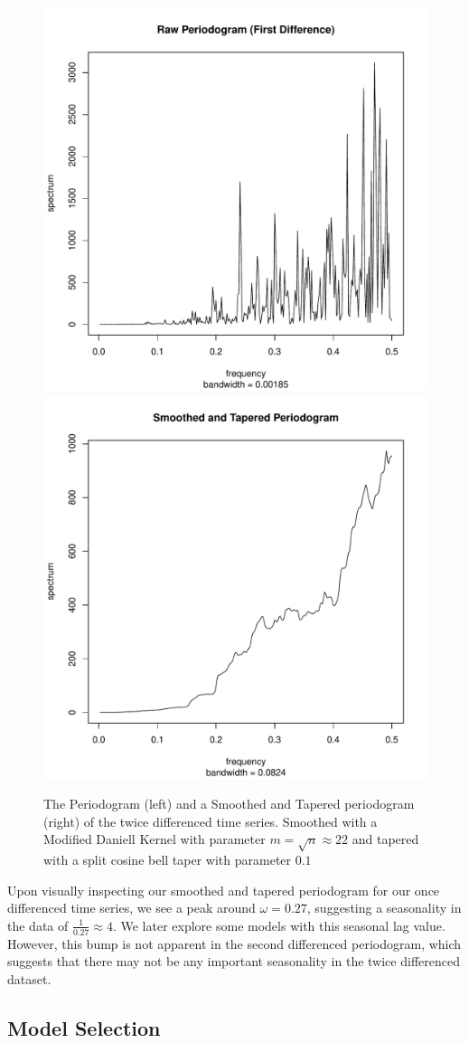 \documentclass[11pt]{paper}
\begin{document}
\begin{figure}
\centering
\includegraphics[width=0.45\linewidth]{../image/raw_periodogram_2.pdf}
\includegraphics[width=0.45\linewidth]{../image/smooth_tapered_periodogram_2.pdf}
\caption{The Periodogram (left) and a Smoothed and Tapered periodogram (right) of the twice differenced time series. Smoothed with a Modified Daniell Kernel with parameter $m = \sqrt{n} \approx 22$ and tapered with a split cosine bell taper with parameter $0.1$}
\label{periodogram2}
\end{figure}

Upon visually inspecting our smoothed and tapered periodogram for our once differenced time series, we see a peak around $\omega = 0.27$, suggesting a seasonality in the data of $\frac{1}{0.27} \approx 4$. We later explore some models with this seasonal lag value. However, this bump is not apparent in the second differenced periodogram, which suggests that there may not be any important seasonality in the twice differenced dataset.

\subsection{Model Selection}
\end{document}
